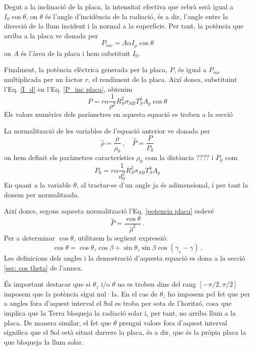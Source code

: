 \documentclass[11pt]{article}
\begin{document}
Degut a la inclinació de la placa, la intensitat efectiva que rebrà serà igual a $I_0 \cos{\theta}$, on $\theta$ és l'angle d'incidència de la radiació, és a dir, l'angle entre la direcció de la llum incident i la normal a la superfície. Per tant, la potència que arriba a la placa ve donada per
\begin{equation}
    P_{inc} = A \alpha I_{\rho} \cos{\theta}
    \label{P_inc placa}
\end{equation}
on $A$ és l'àrea de la placa i hem substituit $I_0$.

Finalment, la potència elèctrica generada per la placa, $P$, és igual a $P_{inc}$ multiplicada per un factor $r$, el rendiment de la placa. Així doncs, substituint l'Eq. \eqref{I_d} en l'Eq. \eqref{P_inc placa}, obtenim
\begin{equation}
    P = r \alpha \frac{1}{\rho^2}R_S^2\sigma_{SB}T_S^4A_p \cos{\theta}
    \label{potencia placa}
\end{equation}
Els valors numèrics dels paràmetres en aquesta equació es troben a la secció 

La normalització de les variables de l'equació anterior ve donada per
\begin{equation}
    \hat{\rho}=\frac{\rho}{\rho_0} \ , \quad
    \hat{P}=\frac{P}{P_0}
\end{equation}
on hem definit els paràmetres característics $\rho_0$ com la distància ???? i $P_0$ com
\begin{equation}
    P_0 = r \alpha \frac{1}{d_0^2}R_S^2\sigma_{SB}T_S^4A_p
    \label{potencia}
\end{equation}
En quant a la variable $\theta$, al tractar-se d'un angle ja és adimensional, i per tant la donem per normalitzada.

Així doncs, segons aquesta normalització l'Eq. \eqref{potencia placa} esdevé
\begin{equation}
    \hat{P} = \frac{\cos{\theta}}{\hat{\rho}^2} \ .
    \label{pot norm}
\end{equation}
Per a determinar $\cos{\theta}$, utilitzem la següent expressió:
\begin{equation}
    \cos \theta = \cos \theta_z \cos \beta + \sin \theta_z \sin \beta \cos (\gamma_s - \gamma) \ .
    \label{cos theta}
\end{equation}
Les definicions dels angles i la demostració d'aquesta equació es dona a la secció \ref{sec: cos theta} de l'annex.

És important destacar que si $\theta_z$ i/o $\theta$ no es troben dins del rang $[-\pi/2,\pi/2]$ imposem que la potència sigui nul·la. En el cas de $\theta_z$ ho imposem pel fet que per a angles fora d'aquest interval el Sol es troba per sota de l'horitzó, cosa que implica que la Terra bloqueja la radiació solar i, per tant, no arriba llum a la placa. De manera similar, el fet que $\theta$ prengui valors fora d'aquest interval significa que el Sol està situat darrere la placa, és a dir, que és la pròpia placa la que bloqueja la llum solar.
\end{document}
